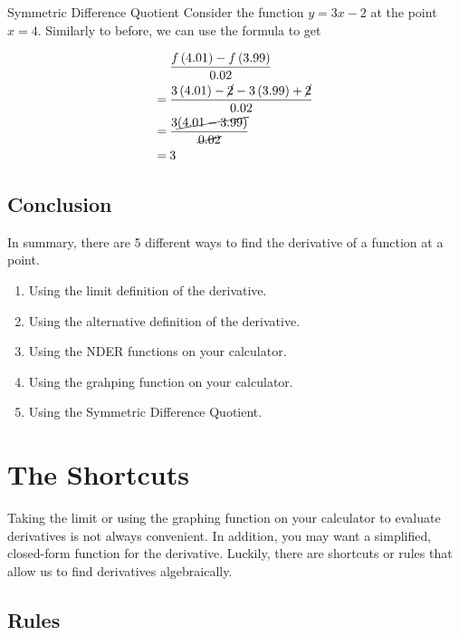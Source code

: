 \begin{example}{Symmetric Difference Quotient}
    Consider the function \( y = 3x - 2 \) at the point \( x = 4 \). Similarly to before, we can use the formula to get
    
    \begin{align}
        &\dfrac{f \left( 4.01 \right) - f \left( 3.99 \right)}{0.02} \\
        = \> &\dfrac{3 \left( 4.01 \right) - \cancel{2} - 3 \left( 3.99 \right) + \cancel{2}}{0.02} \\
        = \> &\dfrac{3 \cancel{\left( 4.01 - 3.99 \right)}}{\cancel{0.02}} \\
        = \> &3
    \end{align}
\end{example}

\subsection{Conclusion}

In summary, there are 5 different ways to find the derivative of a function at a point.

\begin{enumerate}
    \item Using the limit definition of the derivative.
    \item Using the alternative definition of the derivative.
    \item Using the NDER functions on your calculator.
    \item Using the grahping function on your calculator.
    \item Using the Symmetric Difference Quotient.
\end{enumerate}

\section{The Shortcuts}

Taking the limit or using the graphing function on your calculator to evaluate derivatives is not always convenient. In addition, you may want a simplified, closed-form function for the derivative. Luckily, there are shortcuts or rules that allow us to find derivatives algebraically.

\subsection{Rules}

